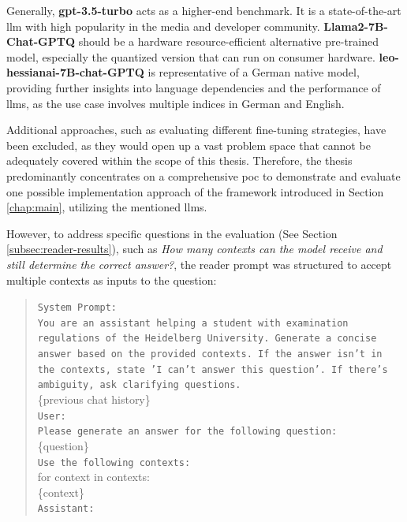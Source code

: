 Generally, \textbf{gpt-3.5-turbo} acts as a higher-end benchmark. It is a state-of-the-art \gls{llm} with high popularity in the media and developer community. \textbf{Llama2-7B-Chat-GPTQ} should be a hardware resource-efficient alternative pre-trained model, especially the quantized version that can run on consumer hardware. \textbf{leo-hessianai-7B-chat-GPTQ} is representative of a German native model, providing further insights into language dependencies and the performance of \gls{llm}s, as the use case involves multiple indices in German and English.

Additional approaches, such as evaluating different fine-tuning strategies, have been excluded, as they would open up a vast problem space that cannot be adequately covered within the scope of this thesis. Therefore, the thesis predominantly concentrates on a comprehensive \gls{poc} to demonstrate and evaluate one possible implementation approach of the framework introduced in Section \ref{chap:main}, utilizing the mentioned \gls{llm}s.

However, to address specific questions in the evaluation (See Section \ref{subsec:reader-results}), such as \textit{How many contexts can the model receive and still determine the correct answer?}, the reader prompt was structured to accept multiple contexts as inputs to the question:

\begin{quote}
    \texttt{System Prompt:} \\
    \texttt{You are an assistant helping a student with examination regulations of the Heidelberg University. Generate a concise answer based on the provided contexts. If the answer isn't in the contexts, state 'I can't answer this question'. If there's ambiguity, ask clarifying questions.} \\
    \{previous chat history\}\\
    \texttt{User:} \\
    \texttt{Please generate an answer for the following question:} \\
    \{question\} \\
    \texttt{Use the following contexts:} \\
    for context in contexts: \\
    \hspace*{1cm}\{context\} \\
    \texttt{Assistant:} \\
\end{quote}

